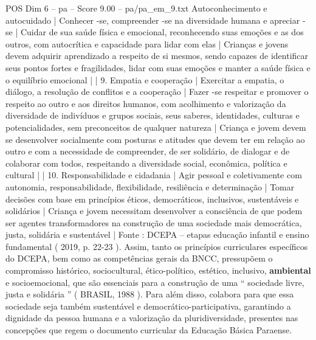 \begin{textsample}{POS Dim 6 – pa – Score 9.00 – pa/pa\_em\_9.txt}
Autoconhecimento e autocuidado | Conhecer -se, compreender -se na diversidade humana e apreciar -se | Cuidar de sua saúde física e emocional, reconhecendo suas emoções e as dos outros, com autocrítica e capacidade para lidar com elas | Crianças e jovens devem adquirir aprendizado a respeito de si mesmos, sendo capazes de identificar seus pontos fortes e fragilidades, lidar com suas emoções e manter a saúde física e o equilíbrio emocional | | 9.
Empatia e cooperação | Exercitar a empatia, o diálogo, a resolução de conflitos e a cooperação | Fazer -se respeitar e promover o respeito ao outro e aos direitos humanos, com acolhimento e valorização da diversidade de indivíduos e grupos sociais, seus saberes, identidades, culturas e potencialidades, sem preconceitos de qualquer natureza | Criança e jovem devem se desenvolver socialmente com posturas e atitudes que devem ter em relação ao outro e com a necessidade de compreender, de ser solidário, de dialogar e de colaborar com todos, respeitando a diversidade social, econômica, política e cultural | | 10.
Responsabilidade e cidadania | Agir pessoal e coletivamente com autonomia, responsabilidade, flexibilidade, resiliência e determinação | Tomar decisões com base em princípios éticos, democráticos, inclusivos, sustentáveis e solidários | Criança e jovem necessitam desenvolver a consciência de que podem ser agentes transformadores na construção de uma sociedade mais democrática, justa, solidária e sustentável | Fonte : DCEPA – etapas educação infantil e ensino fundamental ( 2019, p. 22-23 ).
Assim, tanto os princípios curriculares específicos do DCEPA, bem como as competências gerais da BNCC, pressupõem o compromisso histórico, sociocultural, ético-político, estético, inclusivo, \textbf{ambiental} e socioemocional, que são essenciais para a construção de uma “ sociedade livre, justa e solidária ” ( BRASIL, 1988 ).
Para além disso, colabora para que essa sociedade seja também sustentável e democrático-participativa, garantindo a dignidade da pessoa humana e a valorização da pluridiversidade, presentes nas concepções que regem o documento curricular da Educação Básica Paraense.

\end{textsample}
